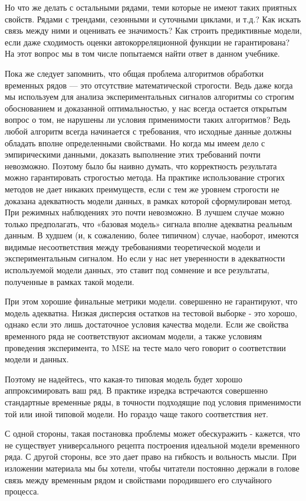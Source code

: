 Но что же делать с остальными рядами, теми которые не имеют таких
приятных свойств. Рядами с трендами, сезонными и суточными
циклами, и т.д.? Как искать связь между ними и оценивать ее
значимость? Как строить предиктивные модели, если даже сходимость
оценки автокорреляционной функции не гарантирована? На этот вопрос мы в том
числе попытаемся найти ответ в данном учебнике.

Пока же следует запомнить, что общая проблема алгоритмов обработки
временных рядов — это отсутствие математической строгости. Ведь даже когда
мы используем для анализа экспериментальных сигналов алгоритмы со
строгим обоснованием и доказанной оптимальностью, у нас всегда
остается открытым вопрос о том, не нарушены ли условия применимости
таких алгоритмов? Ведь любой алгоритм всегда начинается с требования,
что исходные данные должны обладать вполне
определенными свойствами. Но когда мы имеем дело с
эмпирическими данными, доказать выполнение этих требований
почти невозможно. Поэтому было бы наивно думать, что корректность
результата можно гарантировать строгостью метода. На практике
использование строгих методов не дает никаких преимуществ, если с
тем же уровнем строгости не доказана адекватность модели данных, в
рамках которой сформулирован метод. При режимных наблюдениях это
почти невозможно. В лучшем случае можно только предполагать, что
«базовая модель» сигнала вполне адекватна реальным данным. В худшем
(и, к сожалению, более типичном) случае, наоборот, имеются видимые
несоответствия между требованиями теоретической модели и
экспериментальным сигналом. Но если у нас нет уверенности в
адекватности используемой модели данных, это ставит под сомнение и
все результаты, полученные в рамках такой модели.

При этом хорошие финальные метрики модели. совершенно не гарантируют,
что модель адекватна. Низкая дисперсия остатков на тестовой выборке -
это хорошо, однако если это лишь достаточное условия качества модели.
Если же свойства временного ряда не соответствуют аксиомам модели, а
также условиям проведения эксперимента, то MSE на тесте мало чего
говорит о соответствии модели и данных.

Поэтому не надейтесь, что какая-то типовая модель будет хорошо
аппроксимировать ваш ряд. В практике изредка встречаются совершенно стандартные
временные ряды, в точности подходящие под условия применимости той
или иной типовой модели. Но гораздо чаще такого соответствия нет.

С одной стороны, такая постановка проблемы может обескуражить -
кажется, что не существует универсального рецепта построения
идеальной модели временного ряда. С другой стороны, все это дает
право на гибкость и вольность мысли.
При изложении материала мы бы хотели, чтобы читатели постоянно
держали в голове связь между временным рядом и свойствами
породившего его случайного процесса.

